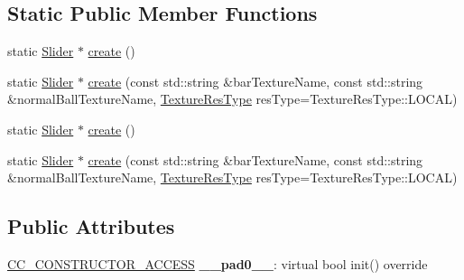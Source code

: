 \subsection*{Static Public Member Functions}
\begin{DoxyCompactItemize}
\item 
static \hyperlink{classui_1_1Slider}{Slider} $\ast$ \hyperlink{classui_1_1Slider_ad72d0510636270071bb9ada11daebd8a}{create} ()
\item 
static \hyperlink{classui_1_1Slider}{Slider} $\ast$ \hyperlink{classui_1_1Slider_ad5b871bc3a893142c89336a2ac6d13a4}{create} (const std\+::string \&bar\+Texture\+Name, const std\+::string \&normal\+Ball\+Texture\+Name, \hyperlink{classui_1_1Widget_a040a65ec5ad3b11119b7e16b98bd9af0}{Texture\+Res\+Type} res\+Type=Texture\+Res\+Type\+::\+L\+O\+C\+AL)
\item 
static \hyperlink{classui_1_1Slider}{Slider} $\ast$ \hyperlink{classui_1_1Slider_aa78d95ee4b7bf72f80e94cfee6c7a9ae}{create} ()
\item 
static \hyperlink{classui_1_1Slider}{Slider} $\ast$ \hyperlink{classui_1_1Slider_a996794c0506d26fd83437cc47a5b87ea}{create} (const std\+::string \&bar\+Texture\+Name, const std\+::string \&normal\+Ball\+Texture\+Name, \hyperlink{classui_1_1Widget_a040a65ec5ad3b11119b7e16b98bd9af0}{Texture\+Res\+Type} res\+Type=Texture\+Res\+Type\+::\+L\+O\+C\+AL)
\end{DoxyCompactItemize}
\subsection*{Public Attributes}
\begin{DoxyCompactItemize}
\item 
\mbox{\label{classui_1_1Slider_a1a98f8ec4e07c4b414296e903f59c6e7}} 
\hyperlink{_2cocos2d_2cocos_2base_2ccConfig_8h_a25ef1314f97c35a2ed3d029b0ead6da0}{C\+C\+\_\+\+C\+O\+N\+S\+T\+R\+U\+C\+T\+O\+R\+\_\+\+A\+C\+C\+E\+SS} {\bfseries \+\_\+\+\_\+pad0\+\_\+\+\_\+}\+: virtual bool init() override
\end{DoxyCompactItemize}
